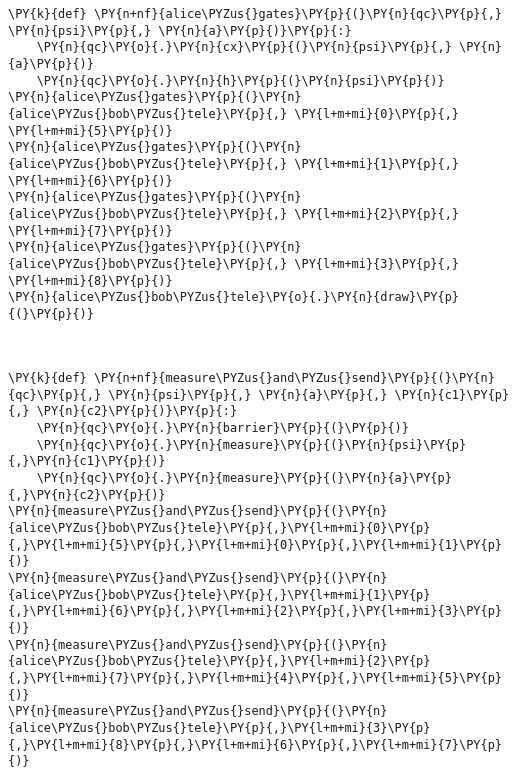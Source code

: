     \begin{tcolorbox}[breakable, size=fbox, boxrule=1pt, pad at break*=1mm,colback=cellbackground, colframe=cellborder]
\begin{Verbatim}[commandchars=\\\{\}]
\PY{k}{def} \PY{n+nf}{alice\PYZus{}gates}\PY{p}{(}\PY{n}{qc}\PY{p}{,} \PY{n}{psi}\PY{p}{,} \PY{n}{a}\PY{p}{)}\PY{p}{:}
    \PY{n}{qc}\PY{o}{.}\PY{n}{cx}\PY{p}{(}\PY{n}{psi}\PY{p}{,} \PY{n}{a}\PY{p}{)}
    \PY{n}{qc}\PY{o}{.}\PY{n}{h}\PY{p}{(}\PY{n}{psi}\PY{p}{)}
\PY{n}{alice\PYZus{}gates}\PY{p}{(}\PY{n}{alice\PYZus{}bob\PYZus{}tele}\PY{p}{,} \PY{l+m+mi}{0}\PY{p}{,} \PY{l+m+mi}{5}\PY{p}{)}
\PY{n}{alice\PYZus{}gates}\PY{p}{(}\PY{n}{alice\PYZus{}bob\PYZus{}tele}\PY{p}{,} \PY{l+m+mi}{1}\PY{p}{,} \PY{l+m+mi}{6}\PY{p}{)}
\PY{n}{alice\PYZus{}gates}\PY{p}{(}\PY{n}{alice\PYZus{}bob\PYZus{}tele}\PY{p}{,} \PY{l+m+mi}{2}\PY{p}{,} \PY{l+m+mi}{7}\PY{p}{)}
\PY{n}{alice\PYZus{}gates}\PY{p}{(}\PY{n}{alice\PYZus{}bob\PYZus{}tele}\PY{p}{,} \PY{l+m+mi}{3}\PY{p}{,} \PY{l+m+mi}{8}\PY{p}{)}
\PY{n}{alice\PYZus{}bob\PYZus{}tele}\PY{o}{.}\PY{n}{draw}\PY{p}{(}\PY{p}{)}
\end{Verbatim}
\end{tcolorbox}
 
            
    
    \begin{center}
    \end{center}
    { \hspace*{\fill} \\}
    

    \begin{tcolorbox}[breakable, size=fbox, boxrule=1pt, pad at break*=1mm,colback=cellbackground, colframe=cellborder]
\begin{Verbatim}[commandchars=\\\{\}]
\PY{k}{def} \PY{n+nf}{measure\PYZus{}and\PYZus{}send}\PY{p}{(}\PY{n}{qc}\PY{p}{,} \PY{n}{psi}\PY{p}{,} \PY{n}{a}\PY{p}{,} \PY{n}{c1}\PY{p}{,} \PY{n}{c2}\PY{p}{)}\PY{p}{:}
    \PY{n}{qc}\PY{o}{.}\PY{n}{barrier}\PY{p}{(}\PY{p}{)}
    \PY{n}{qc}\PY{o}{.}\PY{n}{measure}\PY{p}{(}\PY{n}{psi}\PY{p}{,}\PY{n}{c1}\PY{p}{)}
    \PY{n}{qc}\PY{o}{.}\PY{n}{measure}\PY{p}{(}\PY{n}{a}\PY{p}{,}\PY{n}{c2}\PY{p}{)}
\PY{n}{measure\PYZus{}and\PYZus{}send}\PY{p}{(}\PY{n}{alice\PYZus{}bob\PYZus{}tele}\PY{p}{,}\PY{l+m+mi}{0}\PY{p}{,}\PY{l+m+mi}{5}\PY{p}{,}\PY{l+m+mi}{0}\PY{p}{,}\PY{l+m+mi}{1}\PY{p}{)}
\PY{n}{measure\PYZus{}and\PYZus{}send}\PY{p}{(}\PY{n}{alice\PYZus{}bob\PYZus{}tele}\PY{p}{,}\PY{l+m+mi}{1}\PY{p}{,}\PY{l+m+mi}{6}\PY{p}{,}\PY{l+m+mi}{2}\PY{p}{,}\PY{l+m+mi}{3}\PY{p}{)}
\PY{n}{measure\PYZus{}and\PYZus{}send}\PY{p}{(}\PY{n}{alice\PYZus{}bob\PYZus{}tele}\PY{p}{,}\PY{l+m+mi}{2}\PY{p}{,}\PY{l+m+mi}{7}\PY{p}{,}\PY{l+m+mi}{4}\PY{p}{,}\PY{l+m+mi}{5}\PY{p}{)}
\PY{n}{measure\PYZus{}and\PYZus{}send}\PY{p}{(}\PY{n}{alice\PYZus{}bob\PYZus{}tele}\PY{p}{,}\PY{l+m+mi}{3}\PY{p}{,}\PY{l+m+mi}{8}\PY{p}{,}\PY{l+m+mi}{6}\PY{p}{,}\PY{l+m+mi}{7}\PY{p}{)}
\end{Verbatim}
\end{tcolorbox}

